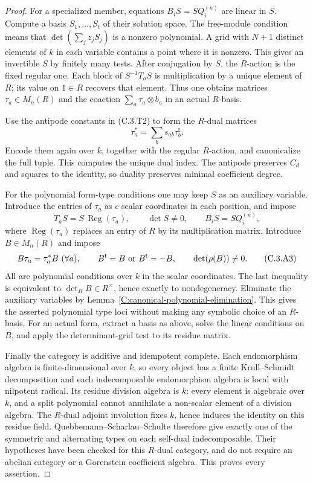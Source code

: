 \begin{proof}
For a specialized member, equations $B_iS=SQ_i^{(n)}$ are linear in $S$.
Compute a basis $S_1,\ldots,S_t$ of their solution space. The free-module
condition means that $\det(\sum_j z_jS_j)$ is a nonzero polynomial.
A grid with $N+1$ distinct elements of $k$ in each variable contains a
point where it is nonzero. This gives an invertible $S$ by finitely many
tests. After conjugation by $S$, the $R$-action is the fixed regular
one. Each block of $S^{-1}T_aS$ is multiplication by a unique element of
$R$; its value on $1\in R$ recovers that element. Thus one obtains
matrices $\tau_a\in M_n(R)$ and the coaction
$\sum_a\tau_a\otimes b_a$ in an actual $R$-basis.

Use the antipode constants in (C.3.T2) to form the $R$-dual matrices
\[
                    \tau_a^*=\sum_b s_{ab}\tau_b^{\mathsf t}.
\]
Encode them again over $k$, together with the regular $R$-action, and
canonicalize the full tuple. This computes the unique dual index.
The antipode preserves $C_d$ and squares to the identity, so duality
preserves minimal coefficient degree.

For the polynomial form-type conditions one may keep $S$ as an auxiliary
variable. Introduce the entries of $\tau_a$ as $c$ scalar coordinates in
each position, and impose
\[
 T_aS=S\,\operatorname{Reg}(\tau_a),\qquad \det S\ne0,
 \qquad B_iS=SQ_i^{(n)},
\]
where $\operatorname{Reg}(\tau_a)$ replaces an entry of $R$ by its
multiplication matrix. Introduce $B\in M_n(R)$ and impose
\[
 B\tau_a=\tau_a^*B\ (\forall a),\qquad
 B^{\mathsf t}=B\ \hbox{or}\ B^{\mathsf t}=-B,
             \qquad \det(\rho(B))\ne0.                  \tag{C.3.A3}
\]
All are polynomial conditions over $k$ in the scalar coordinates.
The last inequality is equivalent to $\det_R B\in R^\times$, hence
exactly to nondegeneracy. Eliminate the auxiliary variables by
Lemma~\ref{C:canonical-polynomial-elimination}. This gives the asserted
polynomial type loci without making any symbolic choice of an $R$-basis.
For an actual form, extract a basis as above, solve the linear conditions
on $B$, and apply the determinant-grid test to its residue matrix.

Finally the category is additive and idempotent complete. Each endomorphism
algebra is finite-dimensional over $k$, so every object has a finite
Krull--Schmidt decomposition and each indecomposable endomorphism algebra
is local with nilpotent radical. Its residue division algebra is $k$:
every element is algebraic over $k$, and a split polynomial cannot
annihilate a non-scalar element of a division algebra. The $R$-dual
adjoint involution fixes $k$, hence induces the identity on this residue
field. Quebbemann--Scharlau--Schulte
\cite[Propositions 2.4--2.5 and Theorem 3.3, pp.271--273]{C-QSS1979}
therefore give exactly one of the symmetric and alternating types on each
self-dual indecomposable. Their hypotheses have been checked for this
$R$-dual category, and do not require an abelian category or a Gorenstein
coefficient algebra. This proves every assertion.
\end{proof}

